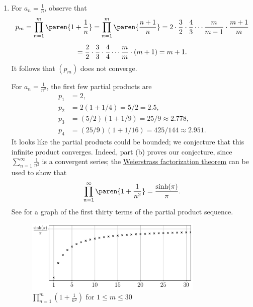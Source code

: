 \documentclass{lew98_solutions}
\begin{document}
\begin{solution}
    \begin{enumerate}
        \item For \( a_n = \tfrac{1}{n} \), observe that
        \begin{multline*}
            p_m = \prod_{n=1}^m \paren{ 1 + \frac{1}{n} } = \prod_{n=1}^m \paren{ \frac{n + 1}{n} } = 2 \cdot \frac{3}{2} \cdot \frac{4}{3} \cdots \frac{m}{m - 1} \cdot \frac{m + 1}{m} \\[2mm]
            = \frac{2}{2} \cdot \frac{3}{3} \cdot \frac{4}{4} \cdots \frac{m}{m} \cdot (m + 1) = m + 1.
        \end{multline*}
        It follows that \( (p_m) \) does not converge.
        
        For \( a_n = \tfrac{1}{n^2} \), the first few partial products are
        \begin{align*}
            p_1 &= 2, \\
            p_2 &= 2(1 + 1/4) = 5/2 = 2.5, \\
            p_3 &= (5/2)(1 + 1/9) = 25/9 \approx 2.778, \\
            p_4  &= (25/9)(1 + 1/16) = 425/144 \approx 2.951.
        \end{align*}
        It looks like the partial products could be bounded; we conjecture that this infinite product converges. Indeed, part (b) proves our conjecture, since \( \sum_{n=1}^{\infty} \tfrac{1}{n^2} \) is a convergent series; the \href{https://en.wikipedia.org/wiki/Weierstrass_factorization_theorem}{Weierstrass factorization theorem} can be used to show that
        \[
            \prod_{n=1}^{\infty} \paren{ 1 + \frac{1}{n^2} } = \frac{\sinh (\pi)}{\pi}.
        \]
        See  for a graph of the first thirty terms of the partial product sequence.
        \begin{figure}[H]
            \centering
            \includegraphics[width=0.8\textwidth]{UA_Figures/UA_ex2_4_10_fig.pdf}
            \caption{\( \prod_{n=1}^m \left( 1 + \frac{1}{n^2} \right) \) for \( 1 \leq m \leq 30 \)}
            \label{fig:ex2.4.10}
        \end{figure}


\end{enumerate}
\end{solution}
\end{document}
